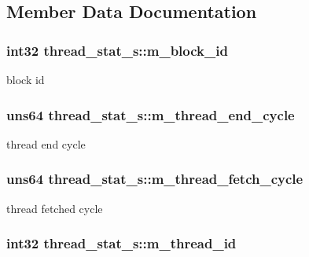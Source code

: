 \subsection{Member Data Documentation}
\hypertarget{structthread__stat__s_aeed9fab1f2482c5e5c8596701fe9ad59}{
\subsubsection[{m\_\-block\_\-id}]{\setlength{\rightskip}{0pt plus 5cm}int32 {\bf thread\_\-stat\_\-s::m\_\-block\_\-id}}}
\label{structthread__stat__s_aeed9fab1f2482c5e5c8596701fe9ad59}
block id \hypertarget{structthread__stat__s_afce91d61a581f23a661f057cf0e535a6}{
\subsubsection[{m\_\-thread\_\-end\_\-cycle}]{\setlength{\rightskip}{0pt plus 5cm}uns64 {\bf thread\_\-stat\_\-s::m\_\-thread\_\-end\_\-cycle}}}
\label{structthread__stat__s_afce91d61a581f23a661f057cf0e535a6}
thread end cycle \hypertarget{structthread__stat__s_abb0486417fb29d4f3bd94afd3d26cd44}{
\subsubsection[{m\_\-thread\_\-fetch\_\-cycle}]{\setlength{\rightskip}{0pt plus 5cm}uns64 {\bf thread\_\-stat\_\-s::m\_\-thread\_\-fetch\_\-cycle}}}
\label{structthread__stat__s_abb0486417fb29d4f3bd94afd3d26cd44}
thread fetched cycle \hypertarget{structthread__stat__s_a73159fa4a36b03ae2affe98e351a3c14}{
\subsubsection[{m\_\-thread\_\-id}]{\setlength{\rightskip}{0pt plus 5cm}int32 {\bf thread\_\-stat\_\-s::m\_\-thread\_\-id}}}
